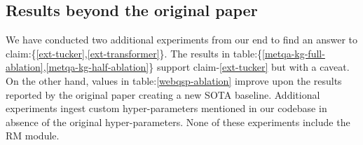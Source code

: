 \subsection{Results beyond the original paper}\label{ext-exp-results}

We have conducted two additional experiments from our end to find an answer to claim:\{\ref{ext-tucker},\ref{ext-transformer}\}. The results in table:\{\ref{metqa-kg-full-ablation},\ref{metqa-kg-half-ablation}\} support claim-\ref{ext-tucker} but with a caveat. On the other hand,  values in table:\ref{webqsp-ablation} improve upon the results reported by the original paper creating a new SOTA baseline. Additional experiments ingest custom hyper-parameters mentioned in our codebase in absence of the original hyper-parameters. None of these experiments include the RM module.


